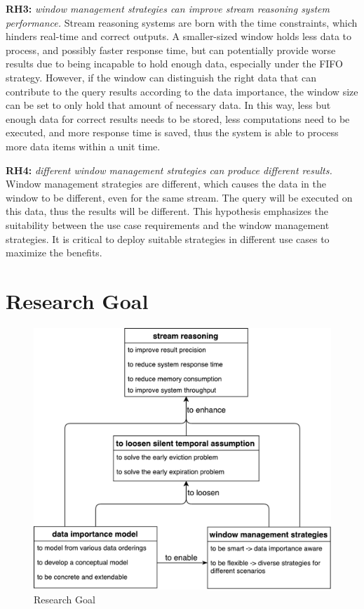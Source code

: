 \textbf{RH3:} \textit{window management strategies can improve stream reasoning system performance.}
Stream reasoning systems are born with the time constraints, which hinders real-time and correct outputs.
A smaller-sized window holds less data to process, and possibly faster response time, but can potentially provide worse results due to being incapable to hold enough data, especially under the FIFO strategy.
However, if the window can distinguish the right data that can contribute to the query results according to the data importance, the window size can be set to only hold that amount of necessary data. 
In this way, less but enough data for correct results needs to be stored, less computations need to be executed, and more response time is saved, thus the system is able to process more data items within a unit time. 

\textbf{RH4:} \textit{different window management strategies can produce different results.}
Window management strategies are different, which causes the data in the window to be different, even for the same stream. 
The query will be executed on this data, thus the results will be different. 
This hypothesis emphasizes the suitability between the use case requirements and the window management strategies. 
It is critical to deploy suitable strategies in different use cases to maximize the benefits.
%
\section{Research Goal}

\begin{figure}[!htbp]
	\centering
    \includegraphics[width=5in]{img/1-rg.pdf}
    \caption{Research Goal}
    \label{fig:1-rg}
\end{figure}

